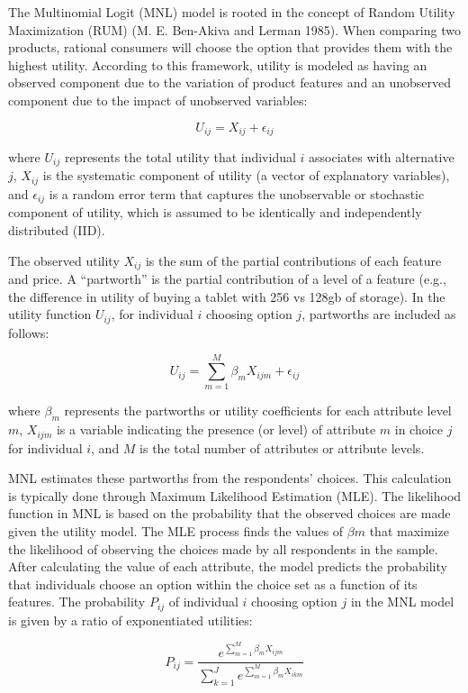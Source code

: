 \documentclass[
  12pt,
]{article}
\begin{document}
The Multinomial Logit (MNL) model is rooted in the concept of Random Utility Maximization (RUM) (M. E. Ben-Akiva and Lerman 1985). When comparing two products, rational consumers will choose the option that provides them with the highest utility. According to this framework, utility is modeled as having an observed component due to the variation of product features and an unobserved component due to the impact of unobserved variables:

\[
U_{ij} = X_{ij} + \epsilon_{ij}
\]

where \(U_{ij}\) represents the total utility that individual \(i\) associates with alternative \(j\), \(X_{ij}\) is the systematic component of utility (a vector of explanatory variables), and \(\epsilon_{ij}\) is a random error term that captures the unobservable or stochastic component of utility, which is assumed to be identically and independently distributed (IID).

The observed utility \(X_{ij}\) is the sum of the partial contributions of each feature and price. A ``partworth'' is the partial contribution of a level of a feature (e.g., the difference in utility of buying a tablet with 256 vs 128gb of storage). In the utility function \(U_{ij}\), for individual \(i\) choosing option \(j\), partworths are included as follows:

\[
U_{ij} = \sum_{m=1}^M \beta_{m} X_{ijm} + \epsilon_{ij}
\]

where \(\beta_{m}\) represents the partworths or utility coefficients for each attribute level \(m\), \(X_{ijm}\) is a variable indicating the presence (or level) of attribute \(m\) in choice \(j\) for individual \(i\), and \(M\) is the total number of attributes or attribute levels.

MNL estimates these partworths from the respondents' choices. This calculation is typically done through Maximum Likelihood Estimation (MLE). The likelihood function in MNL is based on the probability that the observed choices are made given the utility model. The MLE process finds the values of \(\beta m\) that maximize the likelihood of observing the choices made by all respondents in the sample. After calculating the value of each attribute, the model predicts the probability that individuals choose an option within the choice set as a function of its features. The probability \(P_{ij}\) of individual \(i\) choosing option \(j\) in the MNL model is given by a ratio of exponentiated utilities:

\[
P_{ij} = \frac{e^{\sum_{m=1}^M \beta_{m} X_{ijm}}}{\sum_{k=1}^J e^{\sum_{m=1}^M \beta_{m} X_{ikm}}}
\]
\end{document}
